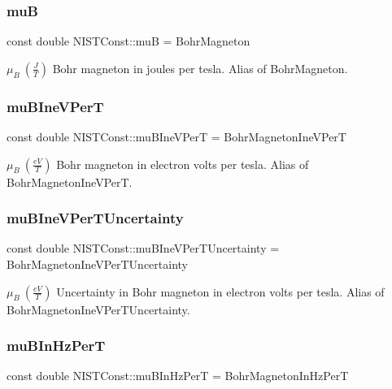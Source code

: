 \subsubsection{\texorpdfstring{muB}{muB}}
{\footnotesize\ttfamily const double N\+I\+S\+T\+Const\+::muB = Bohr\+Magneton}

$\mu_B \ (\frac{J}{T})$ Bohr magneton in joules per tesla. Alias of Bohr\+Magneton. \mbox{\label{group___bohr_magneton_gad2bd4164d07de53146b14398c6d4790d}} 
\subsubsection{\texorpdfstring{mu\+B\+Ine\+V\+PerT}{muBIneVPerT}}
{\footnotesize\ttfamily const double N\+I\+S\+T\+Const\+::mu\+B\+Ine\+V\+PerT = Bohr\+Magneton\+Ine\+V\+PerT}

$\mu_B \ (\frac{eV}{T})$ Bohr magneton in electron volts per tesla. Alias of Bohr\+Magneton\+Ine\+V\+PerT. \mbox{\label{group___bohr_magneton_ga3090988be27d3988c99418e32a538a18}} 
\subsubsection{\texorpdfstring{mu\+B\+Ine\+V\+Per\+T\+Uncertainty}{muBIneVPerTUncertainty}}
{\footnotesize\ttfamily const double N\+I\+S\+T\+Const\+::mu\+B\+Ine\+V\+Per\+T\+Uncertainty = Bohr\+Magneton\+Ine\+V\+Per\+T\+Uncertainty}

$\mu_B \ (\frac{eV}{T})$ Uncertainty in Bohr magneton in electron volts per tesla. Alias of Bohr\+Magneton\+Ine\+V\+Per\+T\+Uncertainty. \mbox{\label{group___bohr_magneton_gac590bf03985de37cfaeea7982dac2aa8}} 
\subsubsection{\texorpdfstring{mu\+B\+In\+Hz\+PerT}{muBInHzPerT}}
{\footnotesize\ttfamily const double N\+I\+S\+T\+Const\+::mu\+B\+In\+Hz\+PerT = Bohr\+Magneton\+In\+Hz\+PerT}

